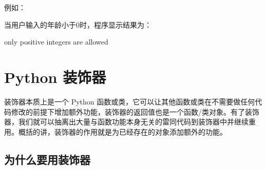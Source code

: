 \documentclass[]{ctexbook}
\newenvironment{Shaded}{\begin{snugshade}}{\end{snugshade}}
\newcommand{\BuiltInTok}[1]{#1}
\newcommand{\ControlFlowTok}[1]{\textcolor[rgb]{0.13,0.29,0.53}{\textbf{#1}}}
\newcommand{\DecValTok}[1]{\textcolor[rgb]{0.00,0.00,0.81}{#1}}
\newcommand{\KeywordTok}[1]{\textcolor[rgb]{0.13,0.29,0.53}{\textbf{#1}}}
\newcommand{\NormalTok}[1]{#1}
\newcommand{\OperatorTok}[1]{\textcolor[rgb]{0.81,0.36,0.00}{\textbf{#1}}}
\newcommand{\PreprocessorTok}[1]{\textcolor[rgb]{0.56,0.35,0.01}{\textit{#1}}}
\newcommand{\StringTok}[1]{\textcolor[rgb]{0.31,0.60,0.02}{#1}}
\begin{document}
例如：

\begin{Shaded}
\end{Shaded}

当用户输入的年龄小于0时，程序显示结果为：

\begin{Shaded}
\begin{Highlighting}[]
\NormalTok{only positive integers are allowed}
\end{Highlighting}
\end{Shaded}

\hypertarget{decorator}{%
\chapter{Python 装饰器}\label{decorator}}

装饰器本质上是一个 Python 函数或类，它可以让其他函数或类在不需要做任何代码修改的前提下增加额外功能，装饰器的返回值也是一个函数/类对象。有了装饰器，我们就可以抽离出大量与函数功能本身无关的雷同代码到装饰器中并继续重用。概括的讲，装饰器的作用就是为已经存在的对象添加额外的功能。

\hypertarget{ux4e3aux4ec0ux4e48ux8981ux7528ux88c5ux9970ux5668}{%
\section{为什么要用装饰器}\label{ux4e3aux4ec0ux4e48ux8981ux7528ux88c5ux9970ux5668}}
\end{document}

